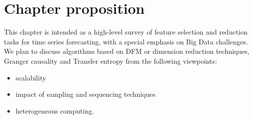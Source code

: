 \documentclass[10pt]{article}
\begin{document}
\section{Chapter proposition}

This chapter is intended as a high-level survey of feature selection and reduction tasks for time series forecasting, with a special emphasis on Big Data challenges. We plan to discuss algorithms based on DFM or dimension reduction techniques, Granger causality and Transfer entropy from the following viewpoints:
\begin{itemize}
\item scalability
\item impact of sampling and sequencing techniques
\item heterogeneous computing.
\end{itemize}




%
%
%
%
\end{document}
